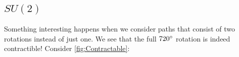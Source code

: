 \subsection{$SU(2)$}
Something interesting happens when we consider paths that consist of two rotations instead of just one. We see that the full $720\degree$ rotation is indeed contractible! Consider \autoref{fig:Contractable}:
\begin{figure}[ht]
    \centering


\begin{tikzpicture}[x=0.75pt,y=0.75pt,yscale=-1,xscale=1]


\end{tikzpicture}
\end{figure}
